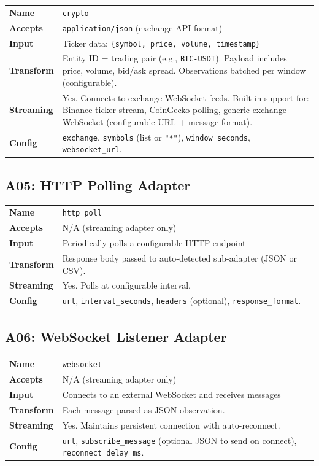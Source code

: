 \documentclass[11pt,a4paper,twoside]{article}
\theoremstyle{definition}
\theoremstyle{plain}
\theoremstyle{remark}
\begin{document}
\begin{tabularx}{\textwidth}{l X}
\toprule
\textbf{Name} & \texttt{crypto} \\
\textbf{Accepts} & \texttt{application/json} (exchange API format) \\
\textbf{Input} & Ticker data: \texttt{\{symbol, price, volume,
  timestamp\}} \\
\textbf{Transform} & Entity ID = trading pair (e.g.,
  \texttt{BTC-USDT}). Payload includes price, volume, bid/ask
  spread. Observations batched per window (configurable). \\
\textbf{Streaming} & Yes. Connects to exchange WebSocket feeds.
  Built-in support for: Binance ticker stream, CoinGecko polling,
  generic exchange WebSocket (configurable URL + message format). \\
\textbf{Config} & \texttt{exchange}, \texttt{symbols} (list or
  \texttt{"*"}), \texttt{window\_seconds},
  \texttt{websocket\_url}. \\
\bottomrule
\end{tabularx}

\subsection{A05: HTTP Polling Adapter}

\begin{tabularx}{\textwidth}{l X}
\toprule
\textbf{Name} & \texttt{http\_poll} \\
\textbf{Accepts} & N/A (streaming adapter only) \\
\textbf{Input} & Periodically polls a configurable HTTP endpoint \\
\textbf{Transform} & Response body passed to auto-detected sub-adapter
  (JSON or CSV). \\
\textbf{Streaming} & Yes. Polls at configurable interval. \\
\textbf{Config} & \texttt{url}, \texttt{interval\_seconds},
  \texttt{headers} (optional), \texttt{response\_format}. \\
\bottomrule
\end{tabularx}

\subsection{A06: WebSocket Listener Adapter}

\begin{tabularx}{\textwidth}{l X}
\toprule
\textbf{Name} & \texttt{websocket} \\
\textbf{Accepts} & N/A (streaming adapter only) \\
\textbf{Input} & Connects to an external WebSocket and receives
  messages \\
\textbf{Transform} & Each message parsed as JSON observation. \\
\textbf{Streaming} & Yes. Maintains persistent connection with
  auto-reconnect. \\
\textbf{Config} & \texttt{url}, \texttt{subscribe\_message}
  (optional JSON to send on connect), \texttt{reconnect\_delay\_ms}. \\
\bottomrule
\end{tabularx}
\end{document}

